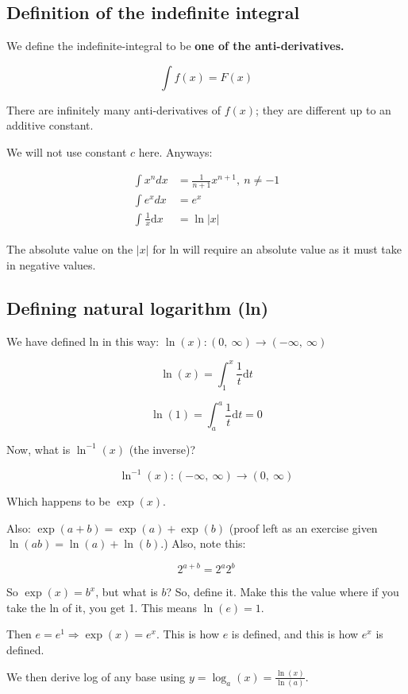 \documentclass[12pt]{article}
\theoremstyle{plain}
\theoremstyle{remark}
\theoremstyle{definition}
\begin{document}
\subsection{Definition of the indefinite
integral}

We define the indefinite-integral to be \textbf{one of the
anti-derivatives.}

\[\int f(x) = F(x)\]

There are infinitely many anti-derivatives of \(f(x)\); they are
different up to an additive constant.

We will not use constant \(c\) here. Anyways:

\begin{align*}
\int x^{n}dx &= \frac{1}{n + 1}x^{n + 1},\ n \neq - 1 \\
\int e^{x}dx &= e^{x} \\
\int_{}^{}{\frac{1}{x}\text{d}x} &= \ln|x|
\end{align*}


The absolute value on the \(|x|\) for ln will require an absolute value
as it must take in negative values.


\subsection{Defining natural logarithm
(ln)}

We have defined ln in this way:
\(\ln(x):(0,\ \infty) \rightarrow ( - \infty,\ \infty)\)

\[\ln(x) = \int_{1}^{x}{\frac{1}{t}\text{d}t}\]

\[\ln(1) = \int_{a}^{a}{\frac{1}{t}\text{d}t} = 0\]

Now, what is \(\ln^{- 1}(x)\) (the inverse)?

\[\ln^{- 1}(x):( - \infty,\ \infty) \rightarrow (0,\ \infty)\]

Which happens to be \(\exp(x)\).

Also: \(\exp(a + b) = \exp(a) + \exp(b)\) (proof left as an exercise
given \(\ln\left( ab \right) = \ln(a) + \ln(b)\).) Also, note
this:

\[2^{a + b} = 2^{a}2^{b}\]

So \(\exp(x) = b^{x}\), but what is \(b\)? So, define it. Make this the
value where if you take the ln of it, you get 1. This means
\(\ln(e) = 1\).

Then \(e = e^{1} \Rightarrow \exp(x) = e^{x}\). This is how \(e\) is
defined, and this is how \(e^{x}\) is defined.

We then derive log of any base using
\(y = \log_{a}(x) = \frac{\ln(x)}{\ln(a)}\).
\end{document}
